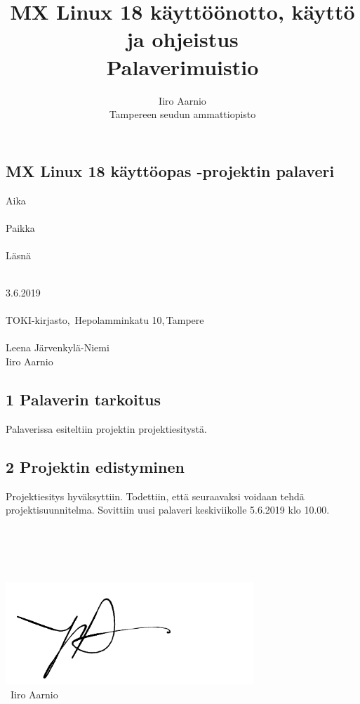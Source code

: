 \documentclass[a4paper, 12pt, finnish]{article}
\title{MX Linux 18 käyttöönotto, käyttö ja ohjeistus \\ \large Palaverimuistio} %
\author{Iiro Aarnio \\ Tampereen seudun ammattiopisto \\}
\begin{document}
\subsection*{MX Linux 18 käyttöopas -projektin palaveri}
\begin{minipage} [t] {0.4\textwidth}
	Aika\\\\
	Paikka\\\\
	Läsnä\\\\
\end{minipage}
\begin{minipage} [t] {0.6\textwidth}
	3.6.2019\\\\
	TOKI-kirjasto,~Hepolamminkatu 10,\,Tampere\\\\
	Leena Järvenkylä-Niemi\\Iiro Aarnio\\
\end{minipage}

\subsection*{1 Palaverin tarkoitus}

\begin{minipage} [t] {0.4\textwidth}
    \phantom{a}
\end{minipage}
\begin{minipage} [t] {0.6\textwidth}
Palaverissa esiteltiin projektin projektiesitystä.
\end{minipage}

\subsection*{2 Projektin edistyminen}
\begin{minipage} [t] {0.4\textwidth}
    \phantom{a}
\end{minipage}
\begin{minipage} [t] {0.6\textwidth}
Projektiesitys hyväksyttiin. Todettiin, että seuraavaksi voidaan tehdä projektisuunnitelma. Sovittiin uusi palaveri keskiviikolle 5.6.2019 klo 10.00.
\end{minipage}
\begin{minipage} [t] {0.4\textwidth}
    \phantom{a}
\end{minipage}
\begin{minipage} [t] {0.6\textwidth}
    \phantom{a}\\\\\\\\
        \includegraphics[width=0.7\textwidth]{sign}
        \\~Iiro Aarnio
\end{minipage}
\end{document}
